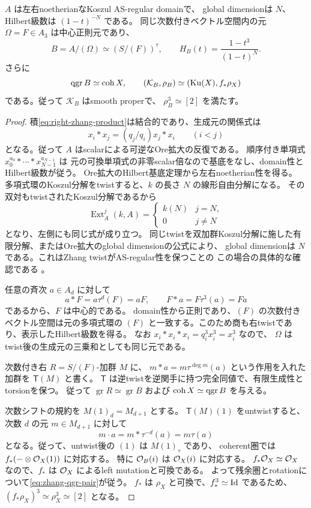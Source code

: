 \begin{lemma}\label{lem:zhang-cubic-structure}
 \(A\) は左右noetherianなKoszul AS-regular domainで、
 global dimensionは \(N\)、Hilbert級数は \((1-t)^{-N}\) である。
 同じ次数付きベクトル空間内の元 \(\Omega=F\in A_3\) は中心正則元であり、
 \[
 B=A/(\Omega)\simeq (S/(F))^{\tau},\qquad
 H_B(t)=\frac{1-t^3}{(1-t)^N}.
 \]
 さらに
 \begin{equation}\label{eq:zhang-qgr-pair}
 \operatorname{qgr} B\simeq\operatorname{coh}X,\qquad
 (\mathcal K_B,\rho_B)\simeq
 (\operatorname{Ku}(X),f_*\rho_X)
 \end{equation}
 である。従って \(\mathcal K_B\) はsmooth properで、
 \(\rho_B^3\simeq[2]\) を満たす。
\end{lemma}
\begin{proof}
 積\eqref{eq:right-zhang-product}は結合的であり、生成元の関係式は
 \[
 x_i*x_j=(q_j/q_i)x_j*x_i\qquad(i<j)
 \]
 となる。従って \(A\) はscalarによる可逆なOre拡大の反復である。
 順序付き単項式 \(x_0^{a_0}*\cdots*x_{N-1}^{a_{N-1}}\) は
 元の可換単項式の非零scalar倍なので基底をなし、domain性とHilbert級数が従う。
 Ore拡大のHilbert基底定理から左右noetherian性を得る。
 多項式環のKoszul分解をtwistすると、\(k\) の長さ \(N\) の線形自由分解になる。
 その双対もtwistされたKoszul分解であるから
 \[
 \operatorname{Ext}^j_A(k,A)=
 \begin{cases}k(N)&j=N,\\0&j\ne N\end{cases}
 \]
 となり、左側にも同じ式が成り立つ。
 同じtwistを双加群Koszul分解に施した有限分解、またはOre拡大のglobal dimensionの公式により、
 global dimensionは \(N\) である。これはZhang twistがAS-regular性を保つことの
 この場合の具体的な確認である \cite{ZhangTwist,RRZ}。

 任意の斉次 \(a\in A_d\) に対して
 \[
 a*F=a\tau^d(F)=aF,
 \qquad F*a=F\tau^3(a)=Fa
 \]
 であるから、\(F\) は中心的である。
 domain性から正則であり、\((F)\) の次数付きベクトル空間は元の多項式環の
 \((F)\) と一致する。このため商も右twistであり、表示したHilbert級数を得る。
 なお \(x_i*x_i*x_i=q_i^3x_i^3=x_i^3\) なので、
 \(\Omega\) はtwist後の生成元の三乗和としても同じ元である。

 次数付き右 \(R=S/(F)\)-加群 \(M\) に、
 \(m*a=m\tau^{\deg m}(a)\) という作用を入れた加群を \(\mathsf T(M)\) と書く。
 \(\mathsf T\) は逆twistを逆関手に持つ完全同値で、有限生成性とtorsionを保つ。
 従って \(\operatorname{gr}R\simeq\operatorname{gr}B\) および
 \(\operatorname{coh}X\simeq\operatorname{qgr} B\) を与える。

 次数シフトの規約を \(M(1)_d=M_{d+1}\) とする。
 \(\mathsf T(M)(1)\) をuntwistすると、次数 \(d\) の元 \(m\in M_{d+1}\) に対して
 \[
 m\cdot a=m*\tau^{-d}(a)=m\tau(a)
 \]
 となる。従って、untwist後の \((1)\) は \(M(1)_{\tau}\) であり、
 coherent圏では \(f_*(-\otimes\mathcal O_X(1))\) に対応する。
 特に \(\mathcal O_B(i)\) は \(\mathcal O_X(i)\) に対応する。
 \(f_*\mathcal O_X\simeq\mathcal O_X\) なので、\(f_*\) は \(\mathcal O_X\) によるleft mutationと可換である。
 よって残余圏とrotationについて\eqref{eq:zhang-qgr-pair}が従う。
 \(f_*\) は \(\rho_X\) と可換で、\(f_*^3\simeq\operatorname{Id}\) であるため、
 \((f_*\rho_X)^3\simeq\rho_X^3\simeq[2]\) となる。
\end{proof}


